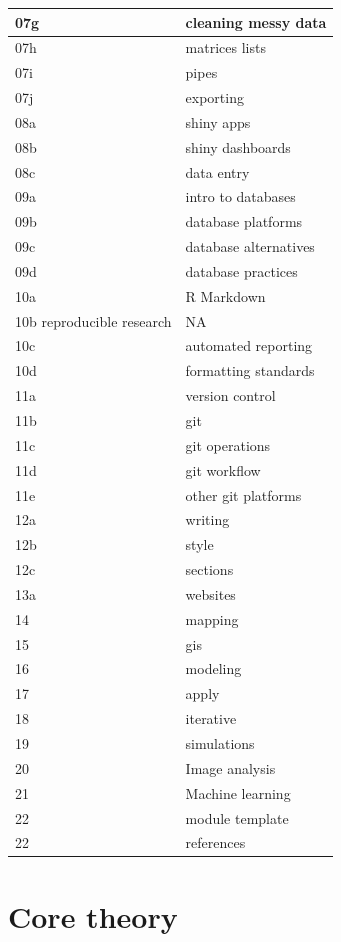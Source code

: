 \documentclass[
]{book}
\begin{document}
\begin{tabular}{l|l}
\hline
07g & cleaning messy data\\
\hline
07h & matrices lists\\
\hline
07i & pipes\\
\hline
07j & exporting\\
\hline
08a & shiny apps\\
\hline
08b & shiny dashboards\\
\hline
08c & data entry\\
\hline
09a & intro to databases\\
\hline
09b & database platforms\\
\hline
09c & database alternatives\\
\hline
09d & database practices\\
\hline
10a & R Markdown\\
\hline
10b reproducible research & NA\\
\hline
10c & automated reporting\\
\hline
10d & formatting standards\\
\hline
11a & version control\\
\hline
11b & git\\
\hline
11c & git operations\\
\hline
11d & git workflow\\
\hline
11e & other git platforms\\
\hline
12a & writing\\
\hline
12b & style\\
\hline
12c & sections\\
\hline
13a & websites\\
\hline
14 & mapping\\
\hline
15 & gis\\
\hline
16 & modeling\\
\hline
17 & apply\\
\hline
18 & iterative\\
\hline
19 & simulations\\
\hline
20 & Image analysis\\
\hline
21 & Machine learning\\
\hline
22 & module template\\
\hline
22 & references\\
\hline
\end{tabular}

\hypertarget{part-core-theory}{%
\part{Core theory}\label{part-core-theory}}
\end{document}
